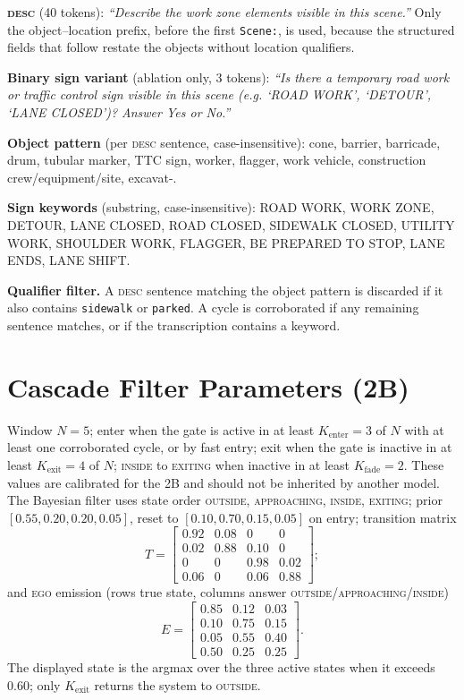 \documentclass[journal]{IEEEtran}
\newcommand{\st}[1]{\textsc{#1}}
\begin{document}
\textbf{\st{desc}} (40 tokens): \emph{``Describe the work zone elements visible in this scene.''}  Only the object--location prefix, before the first \texttt{Scene:}, is used, because the structured fields that follow restate the objects without location qualifiers.

\textbf{Binary sign variant} (ablation only, 3 tokens): \emph{``Is there a temporary road work or traffic control sign visible in this scene (e.g. `ROAD WORK', `DETOUR', `LANE CLOSED')? Answer Yes or No.''}

\textbf{Object pattern} (per \st{desc} sentence, case-insensitive): cone, barrier, barricade, drum, tubular marker, TTC sign, worker, flagger, work vehicle, construction crew/equipment/site, excavat-.

\textbf{Sign keywords} (substring, case-insensitive): ROAD WORK, WORK ZONE, DETOUR, LANE CLOSED, ROAD CLOSED, SIDEWALK CLOSED, UTILITY WORK, SHOULDER WORK, FLAGGER, BE PREPARED TO STOP, LANE ENDS, LANE SHIFT.

\textbf{Qualifier filter.}  A \st{desc} sentence matching the object pattern is discarded if it also contains \texttt{sidewalk} or \texttt{parked}.  A cycle is corroborated if any remaining sentence matches, or if the transcription contains a keyword.

\section{Cascade Filter Parameters (2B)}
\label{app:bayes}

Window $N{=}5$; enter when the gate is active in at least $K_\text{enter}{=}3$ of $N$ with at least one corroborated cycle, or by fast entry; exit when the gate is inactive in at least $K_\text{exit}{=}4$ of $N$; \st{inside} to \st{exiting} when inactive in at least $K_\text{fade}{=}2$.  These values are calibrated for the 2B and should not be inherited by another model.  The Bayesian filter uses state order \st{outside}, \st{approaching}, \st{inside}, \st{exiting}; prior $[0.55, 0.20, 0.20, 0.05]$, reset to $[0.10, 0.70, 0.15, 0.05]$ on entry; transition matrix \[
T = \begin{bmatrix}
0.92 & 0.08 & 0 & 0 \\ 0.02 & 0.88 & 0.10 & 0 \\
0 & 0 & 0.98 & 0.02 \\ 0.06 & 0 & 0.06 & 0.88
\end{bmatrix};
\] and \st{ego} emission (rows true state, columns answer \st{outside}/\st{approaching}/\st{inside}) \[
E = \begin{bmatrix}
0.85 & 0.12 & 0.03 \\ 0.10 & 0.75 & 0.15 \\
0.05 & 0.55 & 0.40 \\ 0.50 & 0.25 & 0.25
\end{bmatrix}.
\] The displayed state is the argmax over the three active states when it exceeds 0.60; only $K_\text{exit}$ returns the system to \st{outside}.
\end{document}
